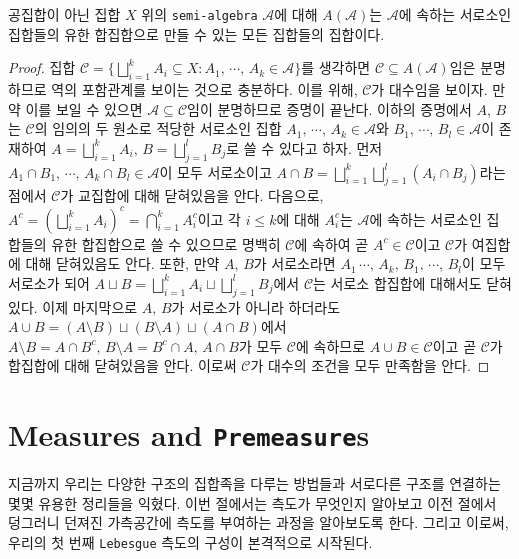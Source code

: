 \begin{theorem}\label{thm:genAlgebra}
    공집합이 아닌 집합 $X$ 위의 \texttt{semi-algebra} $\mathcal{A}$에 대해 $A(\mathcal{A})$는 $\mathcal{A}$에 속하는 서로소인 집합들의 유한 합집합으로 만들 수 있는 모든 집합들의 집합이다.
\end{theorem}

\begin{proof}
    집합 $\mathcal{C}=\{\bigsqcup_{i=1}^kA_i\subseteq X:A_1,\,\cdots,\,A_k\in\mathcal{A}\}$를 생각하면 $\mathcal{C}\subseteq A(\mathcal{A})$임은 분명하므로 역의 포함관계를 보이는 것으로 충분하다. 이를 위해, $\mathcal{C}$가 대수임을 보이자. 만약 이를 보일 수 있으면 $\mathcal{A}\subseteq\mathcal{C}$임이 분명하므로 증명이 끝난다. 이하의 증명에서 $A,\,B$는 $\mathcal{C}$의 임의의 두 원소로 적당한 서로소인 집합 $A_1,\,\cdots,\,A_k\in\mathcal{A}$와 $B_1,\,\cdots,\,B_l\in\mathcal{A}$이 존재하여 $A=\bigsqcup_{i=1}^kA_i,\,B=\bigsqcup_{j=1}^lB_j$로 쓸 수 있다고 하자. 먼저 $A_1\cap B_1,\,\cdots,\,A_k\cap B_l\in\mathcal{A}$이 모두 서로소이고 $A\cap B=\bigsqcup_{i=1}^k\bigsqcup_{j=1}^l(A_i\cap B_j)$라는 점에서 $\mathcal{C}$가 교집합에 대해 닫혀있음을 안다. 다음으로, $A^c=(\bigsqcup_{i=1}^kA_i)^c=\bigcap_{i=1}^kA_i^c$이고 각 $i\leq k$에 대해 $A_i^c$는 $\mathcal{A}$에 속하는 서로소인 집합들의 유한 합집합으로 쓸 수 있으므로 명백히 $\mathcal{C}$에 속하여 곧 $A^c\in\mathcal{C}$이고 $\mathcal{C}$가 여집합에 대해 닫혀있음도 안다. 또한, 만약 $A,\,B$가 서로소라면 $A_1\,\cdots,\,A_k,\,B_1,\,\cdots,\,B_l$이 모두 서로소가 되어 $A\sqcup B=\bigsqcup_{i=1}^kA_i\sqcup\bigsqcup_{j=1}^lB_j$에서 $\mathcal{C}$는 서로소 합집합에 대해서도 닫혀있다. 이제 마지막으로 $A,\,B$가 서로소가 아니라 하더라도 $A\cup B=(A\setminus B)\sqcup(B\setminus A)\sqcup(A\cap B)$에서 $A\setminus B=A\cap B^c,\,B\setminus A=B^c\cap A,\,A\cap B$가 모두 $\mathcal{C}$에 속하므로 $A\cup B\in\mathcal{C}$이고 곧 $\mathcal{C}$가 합집합에 대해 닫혀있음을 안다. 이로써 $\mathcal{C}$가 대수의 조건을 모두 만족함을 안다.
\end{proof}

\section{Measures and \texttt{Premeasure}s}

지금까지 우리는 다양한 구조의 집합족을 다루는 방법들과 서로다른 구조를 연결하는 몇몇 유용한 정리들을 익혔다. 이번 절에서는 측도가 무엇인지 알아보고 이전 절에서 덩그러니 던져진 가측공간에 측도를 부여하는 과정을 알아보도록 한다. 그리고 이로써, 우리의 첫 번째 \texttt{Lebesgue} 측도의 구성이 본격적으로 시작된다.

